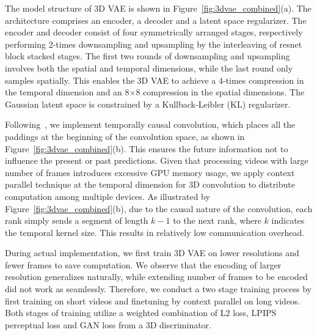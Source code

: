 The model structure of 3D VAE is shown in Figure~\ref{fig:3dvae_combined}(a). The architecture comprises an encoder, a decoder and a latent space regularizer. The encoder and decoder consist of four symmetrically arranged stages, respectively performing 2-times downsampling and upsampling by the interleaving of resnet block stacked stages. The first two rounds of downsampling and upsampling involves both the spatial and temporal dimensions, while the last round only samples spatially. This enables the 3D VAE to achieve a 4-times compression in the temporal dimension and an 8$\times$8 compression in the spatial dimensions. The Gaussian latent space is constrained by a Kullback-Leibler (KL) regularizer.

Following~\cite{yu2023language}, we implement temporally causal convolution, which places all the paddings at the beginning of the convolution space, as shown in Figure~\ref{fig:3dvae_combined}(b). This ensures the future information not to influence the present or past predictions. Given that processing videos with large number of frames introduces excessive GPU memory usage, we apply context parallel technique at the temporal dimension for 3D convolution to distribute computation among multiple devices. As illustrated by Figure~\ref{fig:3dvae_combined}(b), due to the causal nature of the convolution, each rank simply sends a segment of length $k-1$ to the next rank, where $k$ indicates the temporal kernel size. This results in relatively low communication overhead.

During actual implementation, we first train 3D VAE on lower resolutions and fewer frames to save computation. We observe that the encoding of larger resolution generalizes naturally, while extending number of frames to be encoded did not work as seamlessly. 
Therefore, we conduct a two stage training process by first training on short videos and finetuning by context parallel on long videos. Both stages of training utilize a weighted combination of L2 loss, LPIPS~\citep{zhang2018unreasonable} perceptual loss and GAN loss from a 3D discriminator.
